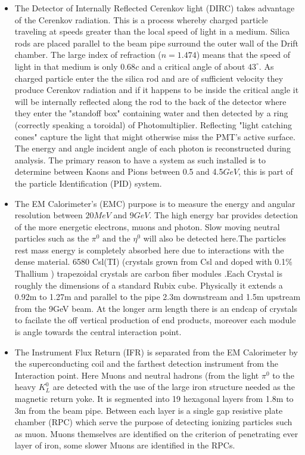\documentclass[floatfix,aps,prd,amsmath,amssymb]{revtex4}
\begin{document}
\begin{itemize}
\item The Detector of Internally Reflected Cerenkov light (DIRC) takes advantage of the Cerenkov radiation. This is a process whereby charged particle traveling at speeds greater than the local speed of light in a medium. Silica rods are placed parallel to the beam pipe surround the outer wall of the Drift chamber. The large index of refraction ($n= 1.474$) means that the speed of light in that medium is only $0.68c$ and a critical angle of about $43^{\circ}$. As charged particle enter the the silica rod and are of sufficient velocity they produce Cerenkov radiation and if it happens to be inside the critical angle it will be internally reflected along the rod to the back of the detector where they enter the "standoff box" containing water and then detected by a ring (correctly speaking a toroidal) of Photomultiplier. Reflecting "light catching cones" capture the light that might otherwise miss the PMT's active surface.  The energy and angle incident angle of each photon is reconstructed during analysis. The primary reason to have a system as such installed is to determine between Kaons and Pions between 0.5 and 4.5$GeV$, this is part of the particle Identification (PID) system. 


\item The EM Calorimeter's (EMC) purpose is to measure the energy and angular resolution between $20MeV$ and $9GeV$. The high energy bar provides detection of the more energetic electrons, muons and photon. Slow moving neutral particles such as the $\pi^0 \mbox{ and the } \eta^0$ will also be detected here.The particles rest mass energy is completely absorbed here due to interactions with the dense material. 6580 Csl(TI) (crystals grown from Csl and doped with 0.1$\%$ Thallium ) trapezoidal crystals are carbon fiber modules .Each Crystal is roughly the dimensions of a standard Rubix cube. Physically it extends a 0.92m to 1.27m and parallel to the pipe 2.3m downstream and 1.5m upstream from the 9GeV beam. At the longer arm length there is an endcap of crystals to facilate the off vertical production of end products, moreover each module is angle towards the central interaction point.

\item The Instrument Flux Return (IFR) is separated from the EM Calorimeter by the superconducting coil and the farthest detection instrument from the Interaction point. Here Muons and neutral hadrons (from the light $\pi^0$ to the heavy $K^{0}_{L}$ are detected with the use of the large iron structure needed as the magnetic return yoke. It is segmented into 19 hexagonal layers from 1.8m to 3m from the beam pipe. Between each layer is a single gap resistive plate chamber (RPC) which serve the purpose of detecting ionizing particles such as muon. Muons themselves are identified on the criterion of penetrating ever layer of iron, some slower Muons are identified in the RPCs. 
\end{itemize}
\end{document}
